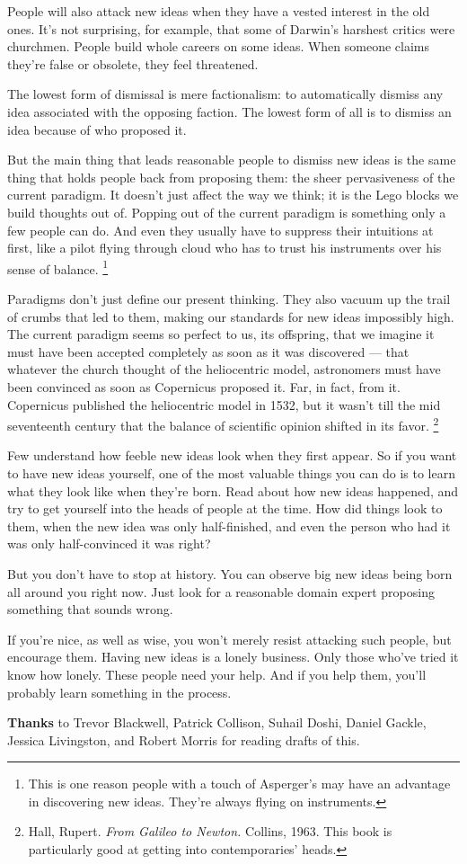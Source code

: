 People will also attack new ideas when they have a vested interest in
the old ones. It's not surprising, for example, that some of Darwin's
harshest critics were churchmen. People build whole careers on some
ideas. When someone claims they're false or obsolete, they feel
threatened.

The lowest form of dismissal is mere factionalism: to automatically
dismiss any idea associated with the opposing faction. The lowest form
of all is to dismiss an idea because of who proposed it.

But the main thing that leads reasonable people to dismiss new ideas is
the same thing that holds people back from proposing them: the sheer
pervasiveness of the current paradigm. It doesn't just affect the way we
think; it is the Lego blocks we build thoughts out of. Popping out of
the current paradigm is something only a few people can do. And even
they usually have to suppress their intuitions at first, like a pilot
flying through cloud who has to trust his instruments over his sense of
balance. \footnote{This is one reason people with a touch of Asperger's may have an
advantage in discovering new ideas. They're always flying on
instruments.}

Paradigms don't just define our present thinking. They also vacuum up
the trail of crumbs that led to them, making our standards for new ideas
impossibly high. The current paradigm seems so perfect to us, its
offspring, that we imagine it must have been accepted completely as soon
as it was discovered --- that whatever the church thought of the
heliocentric model, astronomers must have been convinced as soon as
Copernicus proposed it. Far, in fact, from it. Copernicus published the
heliocentric model in 1532, but it wasn't till the mid seventeenth
century that the balance of scientific opinion shifted in its favor.
\footnote{Hall, Rupert. \emph{From Galileo to Newton.} Collins, 1963. This
book is particularly good at getting into contemporaries' heads.}

Few understand how feeble new ideas look when they first appear. So if
you want to have new ideas yourself, one of the most valuable things you
can do is to learn what they look like when they're born. Read about how
new ideas happened, and try to get yourself into the heads of people at
the time. How did things look to them, when the new idea was only
half-finished, and even the person who had it was only half-convinced it
was right?

But you don't have to stop at history. You can observe big new ideas
being born all around you right now. Just look for a reasonable domain
expert proposing something that sounds wrong.

If you're nice, as well as wise, you won't merely resist attacking such
people, but encourage them. Having new ideas is a lonely business. Only
those who've tried it know how lonely. These people need your help. And
if you help them, you'll probably learn something in the process.


\textbf{Thanks} to Trevor Blackwell, Patrick Collison, Suhail Doshi,
Daniel Gackle, Jessica Livingston, and Robert Morris for reading drafts
of this.